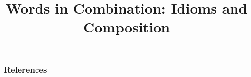 \documentclass{beamer}
\title[Combinations of Words]{Words in Combination: Idioms and Composition}
\begin{document}
 
\maketitle
 



%





\begin{frame}[allowframebreaks]
  \frametitle{References}
  
  
\end{frame}
\end{document}
